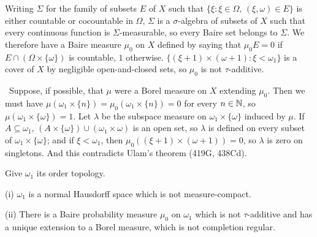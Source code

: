 {Writing $\Sigma$ for the family of subsets $E$ of $X$ such that
$\{\xi:\xi\in\Omega,\,(\xi,\omega)\in E\}$ is either countable or
cocountable in $\Omega$, $\Sigma$ is a $\sigma$-algebra of subsets of
$X$ such that every continuous function is $\Sigma$-measurable, so every
Baire set belongs to $\Sigma$.   We therefore have a Baire measure
$\mu_0$ on $X$ defined by saying that $\mu_0E=0$ if
$E\cap(\Omega\times\{\omega\})$ is countable, $1$ otherwise.
$\{(\xi+1)\times(\omega+1):\xi<\omega_1\}$ is a cover of $X$ by
negligible open-and-closed sets, so $\mu_0$ is not $\tau$-additive.

\Quer\ Suppose, if possible, that $\mu$ were a Borel measure on $X$
extending $\mu_0$.   Then we must have
$\mu(\omega_1\times\{n\})=\mu_0(\omega_1\times\{n\})=0$ for every
$n\in\Bbb N$, so $\mu(\omega_1\times\{\omega\})=1$.   Let $\lambda$ be
the subspace measure on $\omega_1\times\{\omega\}$ induced by $\mu$.
If $A\subseteq\omega_1$, $(A\times\{\omega\})\cup(\omega_1\times\omega)$
is an open set, so $\lambda$ is defined on every subset of
$\omega_1\times\{\omega\}$;  and if $\xi<\omega_1$, then
$\mu_0((\xi+1)\times(\omega+1))=0$, so $\lambda$ is zero on singletons.
And this contradicts Ulam's theorem (419G, 438Cd).\ \Bang
}%

 Give $\omega_1$ its order topology.

(i) $\omega_1$ is a normal Hausdorff space which is not measure-compact.

(ii) There is a Baire probability measure $\mu_0$ on $\omega_1$ which is
not $\tau$-additive and has a unique extension to a Borel measure, which
is not completion regular.

